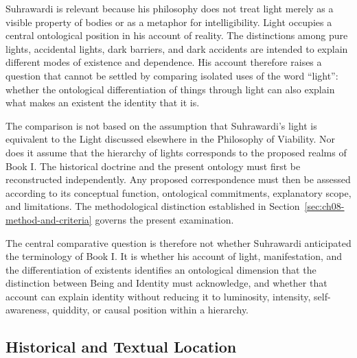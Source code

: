 \label{para:VS.B01.P01.C08.S14.SS01.P002}

Suhrawardi is relevant because his philosophy does not treat light
merely as a visible property of bodies or as a metaphor for
intelligibility. Light occupies a central ontological position
in his account of reality. The distinctions among pure lights,
accidental lights, dark barriers, and dark accidents are intended
to explain different modes of existence and dependence. His
account therefore raises a question that cannot be settled by
comparing isolated uses of the word ``light'': whether the
ontological differentiation of things through light can also
explain what makes an existent the identity that it is.

\label{para:VS.B01.P01.C08.S14.SS01.P003}

The comparison is not based on the assumption that Suhrawardi's
light is equivalent to the Light discussed elsewhere in the
Philosophy of Viability. Nor does it assume that the hierarchy
of lights corresponds to the proposed realms of Book I. The
historical doctrine and the present ontology must first be
reconstructed independently. Any proposed correspondence must
then be assessed according to its conceptual function,
ontological commitments, explanatory scope, and limitations.
The methodological distinction established in
Section~\ref{sec:ch08-method-and-criteria} governs the present
examination.

\label{para:VS.B01.P01.C08.S14.SS01.P004}

The central comparative question is therefore not whether
Suhrawardi anticipated the terminology of Book I. It is whether
his account of light, manifestation, and the differentiation
of existents identifies an ontological dimension that the
distinction between Being and Identity must acknowledge, and
whether that account can explain identity without reducing it
to luminosity, intensity, self-awareness, quiddity, or causal
position within a hierarchy.


\subsection{Historical and Textual Location}
\label{sec:ch08-s14-ss02}

